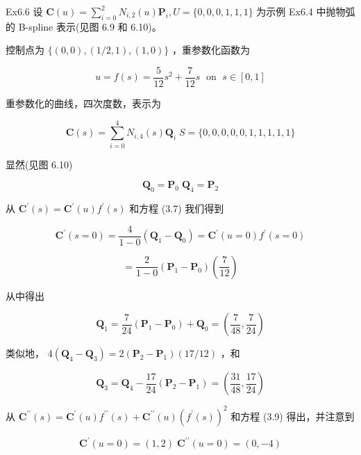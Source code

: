 \documentclass[../main.tex]{subfiles}
\begin{document}
Ex6.6 设 \(\mathbf{C}\left( u\right)  = \mathop{\sum }\limits_{{i = 0}}^{2}{N}_{i,2}\left( u\right) {\mathbf{P}}_{i},U = \{ 0,0,0,1,1,1\}\) 为示例 Ex6.4 中抛物弧的 B-spline 表示(见图 6.9 和 6.10)。

控制点为 \(\{ \left( {0,0}\right) ,\left( {1/2,1}\right) ,\left( {1,0}\right) \}\) ，重参数化函数为

\[
u = f\left( s\right)  = \frac{5}{12}{s}^{2} + \frac{7}{12}s\;\text{ on }\;s \in  \left\lbrack  {0,1}\right\rbrack
\]

重参数化的曲线，四次度数，表示为

\[
\mathbf{C}\left( s\right)  = \mathop{\sum }\limits_{{i = 0}}^{4}{N}_{i,4}\left( s\right) {\mathbf{Q}}_{i}\;S = \{ 0,0,0,0,0,1,1,1,1,1\}  \tag{6.38}
\]

显然(见图 6.10)

\[
{\mathbf{Q}}_{0} = {\mathbf{P}}_{0}\;{\mathbf{Q}}_{4} = {\mathbf{P}}_{2}
\]

从 \({\mathbf{C}}^{\prime }\left( s\right)  = {\mathbf{C}}^{\prime }\left( u\right) {f}^{\prime }\left( s\right)\) 和方程 (3.7) 我们得到

\[
{\mathbf{C}}^{\prime }\left( {s = 0}\right)  = \frac{4}{1 - 0}\left( {{\mathbf{Q}}_{1} - {\mathbf{Q}}_{0}}\right)  = {\mathbf{C}}^{\prime }\left( {u = 0}\right) {f}^{\prime }\left( {s = 0}\right)
\]

\[
= \frac{2}{1 - 0}\left( {{\mathbf{P}}_{1} - {\mathbf{P}}_{0}}\right) \left( \frac{7}{12}\right)
\]



从中得出

\[
{\mathbf{Q}}_{1} = \frac{7}{24}\left( {{\mathbf{P}}_{1} - {\mathbf{P}}_{0}}\right)  + {\mathbf{Q}}_{0} = \left( {\frac{7}{48},\frac{7}{24}}\right)
\]

类似地， \(4\left( {{\mathbf{Q}}_{4} - {\mathbf{Q}}_{3}}\right)  = 2\left( {{\mathbf{P}}_{2} - {\mathbf{P}}_{1}}\right) \left( {{17}/{12}}\right)\) ，和

\[
{\mathbf{Q}}_{3} = {\mathbf{Q}}_{4} - \frac{17}{24}\left( {{\mathbf{P}}_{2} - {\mathbf{P}}_{1}}\right)  = \left( {\frac{31}{48},\frac{17}{24}}\right)
\]

从 \({\mathbf{C}}^{\prime \prime }\left( s\right)  = {\mathbf{C}}^{\prime }\left( u\right) {f}^{\prime \prime }\left( s\right)  + {\mathbf{C}}^{\prime \prime }\left( u\right) {\left( {f}^{\prime }\left( s\right) \right) }^{2}\) 和方程 (3.9) 得出，并注意到

\[
{\mathbf{C}}^{\prime }\left( {u = 0}\right)  = \left( {1,2}\right) \;{\mathbf{C}}^{\prime \prime }\left( {u = 0}\right)  = \left( {0, - 4}\right)
\]
\end{document}
